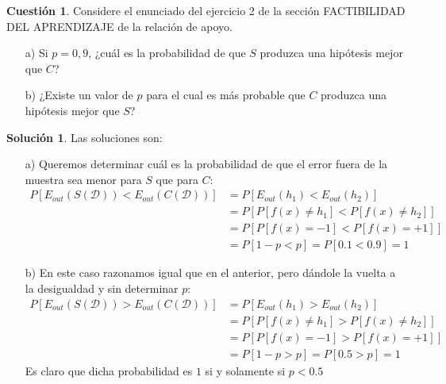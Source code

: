 \documentclass[a4paper, 11pt]{article}
\theoremstyle{definition}
\newtheorem{cuestion}{Cuestión}
\newtheorem*{solucion}{Solución}
\begin{document}
  \begin{cuestion}
  Considere el enunciado del ejercicio 2 de la sección FACTIBILIDAD DEL APRENDIZAJE de la relación de apoyo.
  \begin{enumerate}
  \item[a)] Si $p=0,9$, ¿cuál es la probabilidad de que $S$ produzca una hipótesis mejor que $C$?
  \item[b)] ¿Existe un valor de $p$ para el cual es más probable que $C$ produzca una hipótesis mejor que $S$?
  \end{enumerate}
  \end{cuestion}

  \begin{solucion}
    Las soluciones son:
    \begin{enumerate}
      \item[a)] Queremos determinar cuál es la probabilidad de que el error fuera de la muestra sea menor para $S$ que para $C$:
        \begin{equation}
          \begin{split}
            P\left[E_{out}(S(\mathcal{D})) < E_{out}(C(\mathcal{D}))  \right] &=           P\left[E_{out}(h_1) < E_{out}(h_2)  \right] \\
            &= P\left[P\left[f(x) \neq h_1\right] < P\left[f(x) \neq h_2\right]  \right] \\
            &= P\left[P\left[f(x) = -1\right] < P\left[f(x) =+1\right]  \right] \\
            &= P\left[1-p < p \right] = P\left[0.1 < 0.9 \right] = 1
          \end{split}
        \end{equation}
      \item[b)] En este caso  razonamos igual que en el anterior, pero dándole la vuelta a la desigualdad y sin determinar $p$:
      \begin{equation}
        \begin{split}
          P\left[E_{out}(S(\mathcal{D})) > E_{out}(C(\mathcal{D}))  \right] &=           P\left[E_{out}(h_1) > E_{out}(h_2)  \right] \\
          &= P\left[P\left[f(x) \neq h_1\right] > P\left[f(x) \neq h_2\right]  \right] \\
          &= P\left[P\left[f(x) = -1\right] > P\left[f(x) =+1\right]  \right] \\
          &= P\left[1-p > p \right] = P\left[ 0.5 > p \right] = 1
        \end{split}
      \end{equation}
      Es claro que dicha probabilidad es $1$ si y solamente si $p < 0.5$
    \end{enumerate}
  \end{solucion}
\end{document}
